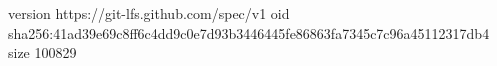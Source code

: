 version https://git-lfs.github.com/spec/v1
oid sha256:41ad39e69c8ff6c4dd9c0e7d93b3446445fe86863fa7345c7c96a45112317db4
size 100829
